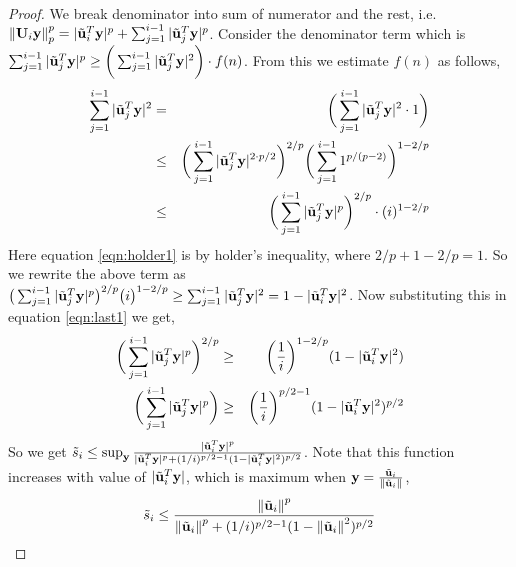 \begin{proof}{\label{proof:onlineSensitivityBound}}
We break denominator into sum of numerator and the rest, i.e. $\left\lVert\mathbf{U}_{i}\mathbf{y}\right\rVert_{p}^{p} = \vert \tilde{\mathbf{u}}_{i}^{T}\mathbf{y}\vert^{p}+\sum_{j=1}^{i-1}\vert \tilde{\mathbf{u}}_{j}^{T}\mathbf{y}\vert^{p}$. %
% 
Consider the denominator term which is $\sum_{j=1}^{i-1}|\tilde{\mathbf{u}}_{j}^{T}\mathbf{y}|^{p} \geq \bigg(\sum_{j=1}^{i-1} |\tilde{\mathbf{u}}_{j}^{T}\mathbf{y}|^{2}\bigg)\cdot f(n)$. From this we estimate $f(n)$ as follows,
\begin{eqnarray}
\sum_{j=1}^{i-1}|\tilde{\mathbf{u}}_{j}^{T}\mathbf{y}|^{2} &=& \bigg(\sum_{j=1}^{i-1}|\tilde{\mathbf{u}}_{j}^{T}\mathbf{y}|^{2}\cdot 1\bigg) \nonumber \\
&\leq& \bigg(\sum_{j=1}^{i-1}|\tilde{\mathbf{u}}_{j}^{T}\mathbf{y}|^{2\cdot p/2}\bigg)^{2/p}\bigg(\sum_{j=1}^{i-1}1^{p/(p-2)}\bigg)^{1-2/p}\label{eqn:holder1}\\
&\leq& \bigg(\sum_{j=1}^{i-1}|\tilde{\mathbf{u}}_{j}^{T}\mathbf{y}|^{p}\bigg)^{2/p}\cdot(i)^{1-2/p} \label{eqn:last1}
\end{eqnarray}
% 
Here equation \eqref{eqn:holder1} is by holder's inequality, where $2/p + 1 - 2/p = 1$. So we rewrite the above term as $\big(\sum_{j=1}^{i-1}|\tilde{\mathbf{u}}_{j}^{T}\mathbf{y}|^{p}\big)^{2/p} \big(i\big)^{1-2/p} \geq \sum_{j=1}^{i-1} |\tilde{\mathbf{u}}_{j}^{T}\mathbf{y}|^{2} = 1 - |\tilde{\mathbf{u}}_{i}^{T}\mathbf{y}|^{2}$. Now substituting this in equation \eqref{eqn:last1} we get,
\begin{eqnarray*}
\bigg(\sum_{j=1}^{i-1}|\tilde{\mathbf{u}}_{j}^{T}\mathbf{y}|^{p}\bigg)^{2/p} &\geq& \bigg(\frac{1}{i}\bigg)^{1-2/p} (1 - |\tilde{\mathbf{u}}_{i}^{T}\mathbf{y}|^{2})\\
\bigg(\sum_{j=1}^{i-1}|\tilde{\mathbf{u}}_{j}^{T}\mathbf{y}|^{p}\bigg) &\geq& \bigg(\frac{1}{i}\bigg)^{p/2-1}(1 - |\tilde{\mathbf{u}}_{i}^{T}\mathbf{y}|^{2})^{p/2}
\end{eqnarray*}
So we get $\tilde{s}_{i} \leq \sup_{\mathbf{y}}\frac{\vert \tilde{\mathbf{u}}_{i}^{T}\mathbf{y}\vert^{p}}{\vert \tilde{\mathbf{u}}_{i}^{T}\mathbf{y}\vert^{p}+(1/i)^{p/2-1}(1-\vert \tilde{\mathbf{u}}_{i}^{T}\mathbf{y}\vert^{2})^{p/2}}$. Note that this function increases with value of $|\tilde{\mathbf{u}}_{i}^{T}\mathbf{y}|$, which is maximum when $\mathbf{y} = \frac{\tilde{\mathbf{u}}_{i}}{\left\lVert\tilde{\mathbf{u}}_{i}\right\rVert}$,
\begin{equation}
 \tilde{s}_{i} \leq \frac{\norm{\tilde{\*u}_{i}}^{p}}{\norm{\tilde{\*u}_{i}}^{p} + (1/i)^{p/2-1}(1-\norm{\tilde{\*u}_{i}}^{2})^{p/2}} \nonumber

\end{equation}
\end{proof}
